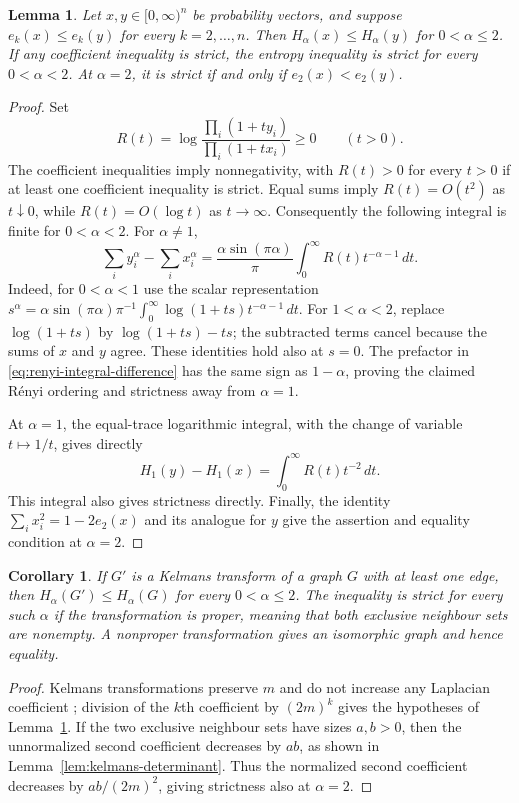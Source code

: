 \documentclass[11pt,a4paper,reqno]{amsart}
\newtheorem{lemma}[theorem]{Lemma}
\newtheorem{corollary}[theorem]{Corollary}
\theoremstyle{remark}
\numberwithin{equation}{section}
\begin{document}
\begin{lemma}\label{lem:renyi-coefficient-order}
Let $x,y\in[0,\infty)^n$ be probability vectors, and suppose
$e_k(x)\le e_k(y)$ for every $k=2,\ldots,n$. Then
$H_\alpha(x)\le H_\alpha(y)$ for $0<\alpha\le2$.
If any coefficient inequality is strict, the entropy inequality is
strict for every $0<\alpha<2$. At $\alpha=2$, it is strict if and
only if $e_2(x)<e_2(y)$.
\end{lemma}
\begin{proof}
Set
\[
 R(t)=\log\frac{\prod_i(1+ty_i)}{\prod_i(1+tx_i)}\ge0
 \qquad(t>0).
\]
The coefficient inequalities imply nonnegativity, with
$R(t)>0$ for every $t>0$ if at least one coefficient inequality is strict.
Equal sums imply
$R(t)=O(t^2)$ as $t\downarrow0$, while $R(t)=O(\log t)$ as
$t\to\infty$. Consequently the following integral is finite for
$0<\alpha<2$. For $\alpha\ne1$,
\begin{equation}\label{eq:renyi-integral-difference}
 \sum_i y_i^\alpha-\sum_i x_i^\alpha
 =\frac{\alpha\sin(\pi\alpha)}{\pi}
   \int_0^\infty R(t)t^{-\alpha-1}\,dt.
\end{equation}
Indeed, for $0<\alpha<1$ use the scalar representation
$s^\alpha=\alpha\sin(\pi\alpha)\pi^{-1}
\int_0^\infty\log(1+ts)t^{-\alpha-1}\,dt$.
For $1<\alpha<2$, replace $\log(1+ts)$ by
$\log(1+ts)-ts$; the subtracted terms cancel because the sums
of $x$ and $y$ agree. These identities hold also at $s=0$.
The prefactor in \eqref{eq:renyi-integral-difference} has the same
sign as $1-\alpha$, proving the claimed R\'enyi ordering and
strictness away from $\alpha=1$.

At $\alpha=1$, the equal-trace logarithmic integral, with the
change of variable $t\mapsto1/t$, gives directly
\[
 H_1(y)-H_1(x)=\int_0^\infty R(t)t^{-2}\,dt.
\]
This integral also gives strictness directly. Finally, the identity
$\sum_i x_i^2=1-2e_2(x)$ and its analogue for $y$ give the assertion
and equality condition at $\alpha=2$.
\end{proof}

\begin{corollary}\label{cor:kelmans-renyi}
If $G'$ is a Kelmans transform of a graph $G$ with at least one
edge, then $H_\alpha(G')\le H_\alpha(G)$ for every
$0<\alpha\le2$. The inequality is strict for every such
$\alpha$ if the transformation is proper, meaning that both
exclusive neighbour sets are nonempty. A nonproper transformation
gives an isomorphic graph and hence equality.
\end{corollary}
\begin{proof}
Kelmans transformations preserve $m$ and do not increase any Laplacian
coefficient \cite[Theorem 8.1]{Csikvari2011}; division of the
$k$th coefficient by $(2m)^k$ gives the hypotheses of
Lemma~\ref{lem:renyi-coefficient-order}. If the two exclusive
neighbour sets have sizes $a,b>0$, then the unnormalized second
coefficient decreases by $ab$, as shown in
Lemma~\ref{lem:kelmans-determinant}. Thus the
normalized second coefficient decreases by $ab/(2m)^2$, giving
strictness also at $\alpha=2$.
\end{proof}
\end{document}
